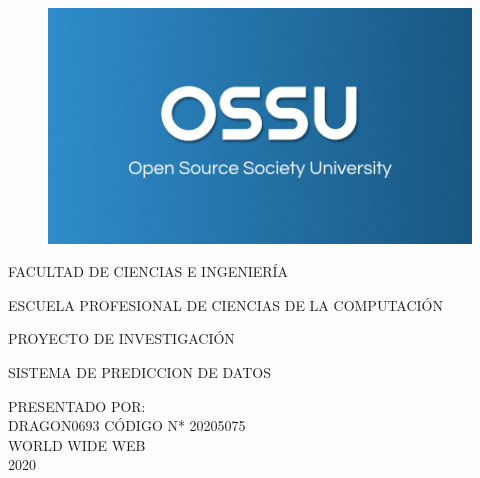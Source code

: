 \begin{titlepage}
	\begin{center}
	\begin{figure}[h]
		\centering
		\includegraphics[scale=0.25]{ossu_logo.png}
\end{figure}
\vspace{5mm}
{\Large FACULTAD DE CIENCIAS E INGENIERÍA}\\
\vspace{5mm}
\begin{spacing}{1.5}
{\large ESCUELA PROFESIONAL DE CIENCIAS DE LA COMPUTACIÓN}
\end{spacing}
\vspace{20mm}
{\Large PROYECTO DE INVESTIGACIÓN}\\
\vspace{10mm}
\begin{spacing}{2}
	{\huge SISTEMA DE PREDICCION DE DATOS}\end{spacing}
\vspace{25mm}
{\large PRESENTADO POR:}\\
\vspace{10mm}
{\small DRAGON0693}
\hspace{5mm} 
CÓDIGO N* 20205075
\\
\vspace{20mm}
{\Large WORLD WIDE WEB}\\
\vspace{5mm}
{\Large 2020}
\end{center}
\end{titlepage}